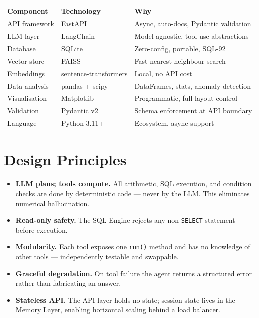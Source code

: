 \documentclass[11pt,a4paper]{article}
\begin{document}
\begin{center}
\begin{tabular}{lll}
\toprule
\textbf{Component} & \textbf{Technology} & \textbf{Why} \\
\midrule
API framework    & FastAPI         & Async, auto-docs, Pydantic validation \\
LLM layer        & LangChain       & Model-agnostic, tool-use abstractions \\
Database         & SQLite          & Zero-config, portable, SQL-92 \\
Vector store     & FAISS           & Fast nearest-neighbour search \\
Embeddings       & sentence-transformers & Local, no API cost \\
Data analysis    & pandas + scipy  & DataFrames, stats, anomaly detection \\
Visualisation    & Matplotlib      & Programmatic, full layout control \\
Validation       & Pydantic v2     & Schema enforcement at API boundary \\
Language         & Python 3.11+    & Ecosystem, async support \\
\bottomrule
\end{tabular}
\end{center}

\section{Design Principles}

\begin{itemize}
  \item \textbf{LLM plans; tools compute.} All arithmetic, SQL execution, and condition checks are done by deterministic code --- never by the LLM. This eliminates numerical hallucination.
  \item \textbf{Read-only safety.} The SQL Engine rejects any non-\texttt{SELECT} statement before execution.
  \item \textbf{Modularity.} Each tool exposes one \texttt{run()} method and has no knowledge of other tools --- independently testable and swappable.
  \item \textbf{Graceful degradation.} On tool failure the agent returns a structured error rather than fabricating an answer.
  \item \textbf{Stateless API.} The API layer holds no state; session state lives in the Memory Layer, enabling horizontal scaling behind a load balancer.
\end{itemize}
\end{document}
